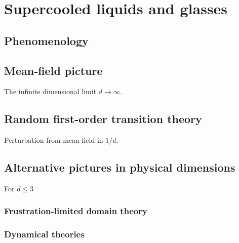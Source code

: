 \section{Supercooled liquids and glasses}
\subsection{Phenomenology}
\subsection{Mean-field picture}
The infinite dimensional limit $d \to \infty$.

\subsection{Random first-order transition theory}
Perturbation from mean-field in $1/d$.

\subsection{Alternative pictures in physical dimensions}
For $d \le 3$
\subsubsection{Frustration-limited domain theory}
\subsubsection{Dynamical theories}
